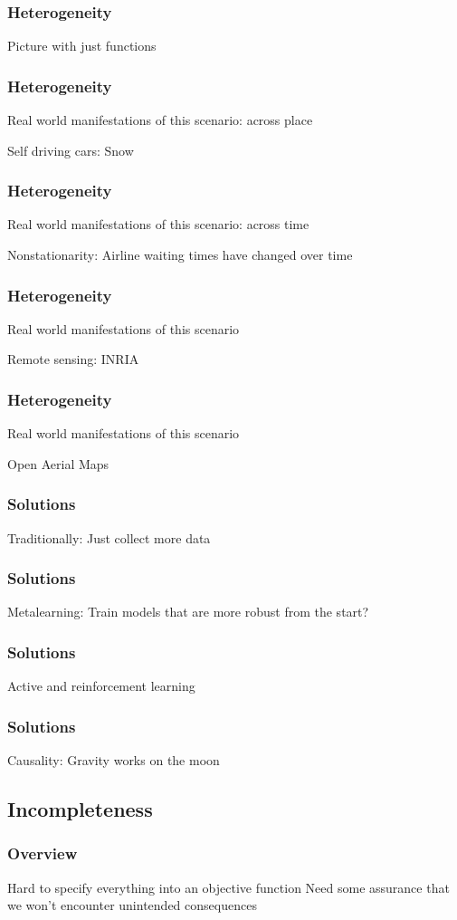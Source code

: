 \documentclass[10pt,mathserif]{beamer}
\begin{document}
\begin{frame}
  \frametitle{Heterogeneity}
  Picture with just functions
\end{frame}

\begin{frame}
  \frametitle{Heterogeneity}
  Real world manifestations of this scenario: across place

  Self driving cars: Snow
\end{frame}

\begin{frame}
  \frametitle{Heterogeneity}
  Real world manifestations of this scenario: across time

  Nonstationarity: Airline waiting times have changed over time
\end{frame}

\begin{frame}
  \frametitle{Heterogeneity}
  Real world manifestations of this scenario

  Remote sensing: INRIA
\end{frame}

\begin{frame}
  \frametitle{Heterogeneity}
  Real world manifestations of this scenario

  Open Aerial Maps
\end{frame}

\begin{frame}[]
  \frametitle{Solutions}
  Traditionally: Just collect more data
\end{frame}

\begin{frame}[]
  \frametitle{Solutions}
  Metalearning: Train models that are more robust from the start?
\end{frame}

\begin{frame}[]
  \frametitle{Solutions}
  Active and reinforcement learning
\end{frame}

\begin{frame}[]
  \frametitle{Solutions}
  Causality: Gravity works on the moon
\end{frame}

\subsection{Incompleteness}
\label{subsec:label}

\begin{frame}
  \frametitle{Overview}
  Hard to specify everything into an objective function
  Need some assurance that we won't encounter unintended consequences
\end{frame}
\end{document}
